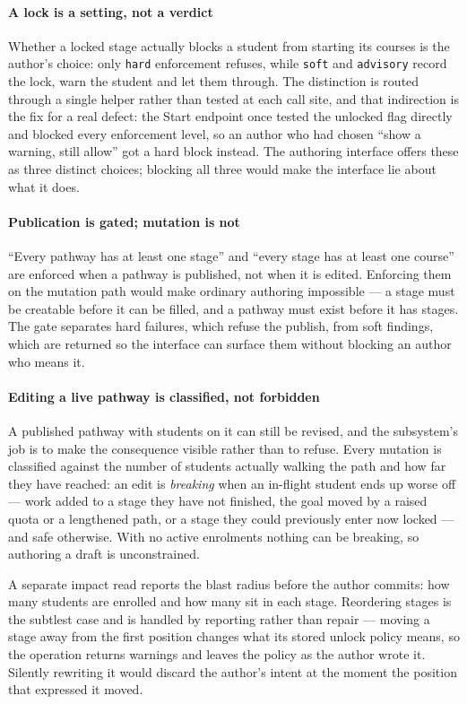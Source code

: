 \paragraph{A lock is a setting, not a verdict}
Whether a locked stage actually blocks a student from starting its courses is the author's choice: only \texttt{hard} enforcement refuses, while \texttt{soft} and \texttt{advisory} record the lock, warn the student and let them through. The distinction is routed through a single helper rather than tested at each call site, and that indirection is the fix for a real defect: the Start endpoint once tested the unlocked flag directly and blocked every enforcement level, so an author who had chosen ``show a warning, still allow'' got a hard block instead. The authoring interface offers these as three distinct choices; blocking all three would make the interface lie about what it does.

\paragraph{Publication is gated; mutation is not}
``Every pathway has at least one stage'' and ``every stage has at least one course'' are enforced when a pathway is published, not when it is edited. Enforcing them on the mutation path would make ordinary authoring impossible --- a stage must be creatable before it can be filled, and a pathway must exist before it has stages. The gate separates hard failures, which refuse the publish, from soft findings, which are returned so the interface can surface them without blocking an author who means it.

\paragraph{Editing a live pathway is classified, not forbidden}
A published pathway with students on it can still be revised, and the subsystem's job is to make the consequence visible rather than to refuse. Every mutation is classified against the number of students actually walking the path and how far they have reached: an edit is \emph{breaking} when an in-flight student ends up worse off --- work added to a stage they have not finished, the goal moved by a raised quota or a lengthened path, or a stage they could previously enter now locked --- and safe otherwise. With no active enrolments nothing can be breaking, so authoring a draft is unconstrained.

A separate impact read reports the blast radius before the author commits: how many students are enrolled and how many sit in each stage. Reordering stages is the subtlest case and is handled by reporting rather than repair --- moving a stage away from the first position changes what its stored unlock policy means, so the operation returns warnings and leaves the policy as the author wrote it. Silently rewriting it would discard the author's intent at the moment the position that expressed it moved.

